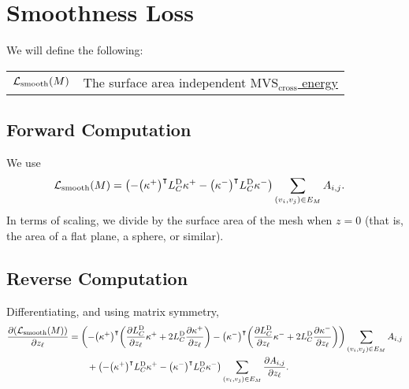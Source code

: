 

\section{Smoothness Loss}

We will define the following: \begin{center}\begin{tabular}{r|l}
	\(\mathcal{L}_{\mathrm{smooth}}\pof{M}\) & The surface area independent \href{http://graphics.berkeley.edu/papers/Joshi-EMC-2007-06/Joshi-EMC-2007-06.pdf}{\(\text{MVS}_{\text{cross}}\) energy}
\end{tabular}\end{center}

\subsection{Forward Computation}
We use \begin{align*}
	\mathcal{L}_{\mathrm{smooth}}\pof{M} &= \pof{-\pof{\kappa^+}^\intercal L_C^{\text{D}}\kappa^+ - \pof{\kappa^-}^\intercal L_C^{\text{D}}\kappa^-} \sum_{\pof{v_i, v_j} \in E_M} A_{i, j}.
\end{align*} In terms of scaling, we divide by the surface area of the mesh when \(z = 0\) (that is, the area of a flat plane, a sphere, or similar).

\subsection{Reverse Computation}
Differentiating, and using matrix symmetry, \begin{align*}
	\frac{\partial\pof{\mathcal{L}_{\mathrm{smooth}}\pof{M}}}{\partial z_\ell} &= \pof{-\pof{\kappa^+}^\intercal\pof{\frac{\partial L_C^{\text{D}}}{\partial z_\ell}\kappa^+ + 2L_C^{\text{D}}\frac{\partial\kappa^+}{\partial z_\ell}} - \pof{\kappa^-}^\intercal\pof{\frac{\partial L_C^{\text{D}}}{\partial z_\ell}\kappa^- + 2L_C^{\text{D}}\frac{\partial\kappa^-}{\partial z_\ell}}} \sum_{\pof{v_i, v_j} \in E_M} A_{i, j} \\
		&\qquad+ \pof{-\pof{\kappa^+}^\intercal L_C^{\text{D}}\kappa^+ - \pof{\kappa^-}^\intercal L_C^{\text{D}}\kappa^-} \sum_{\pof{v_i, v_j} \in E_M} \frac{\partial A_{i, j}}{\partial z_\ell}.
\end{align*}
